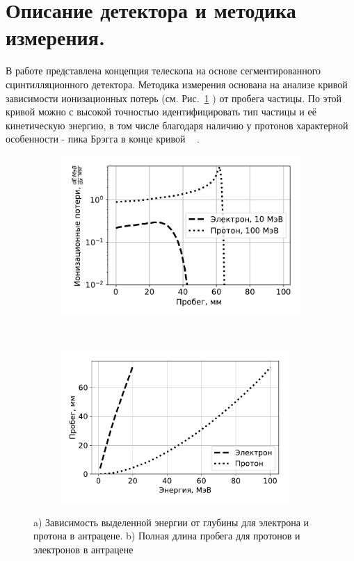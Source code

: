 \documentclass[12pt, a4paper, notitlepage, onecolumn]{article}
\begin{document}
\section*{Описание детектора и методика измерения.}
В работе представлена концепция телескопа на основе сегментированного сцинтилляционного детектора. Методика измерения основана на анализе кривой зависимости ионизационных потерь (см. Рис.~\ref{pic-01-a}  ) от пробега частицы. По этой кривой можно с высокой точностью идентифицировать тип частицы и её кинетическую энергию, в том числе благодаря наличию у протонов характерной особенности - пика Брэгга в конце кривой ~\cite{Gruppen} .
\begin{figure}[ht!]
	\begin{subfigure}[b]{0.5\textwidth}
    	\includegraphics[width=0.95\linewidth]{pictures/01_bregg.pdf}
        \caption{}
        \label{pic-01-a}
    \end{subfigure}
	~
    \begin{subfigure}[b]{0.5\textwidth}
		\includegraphics[width=0.95\textwidth]{pictures/02_range.pdf}
        \caption{}
        \label{pic-01-b}
    \end{subfigure}
    \caption{ a) Зависимость выделенной энергии от глубины для электрона и протона в антрацене. b) Полная длина пробега для протонов и электронов в антрацене}
\end{figure}
\end{document}
